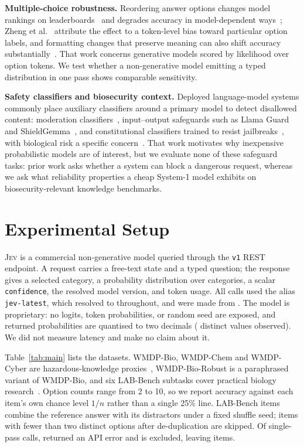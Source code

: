 \documentclass[conference,compsoc]{IEEEtran}
\newcommand{\jev}{\textsc{Jev}}
\begin{document}
\textbf{Multiple-choice robustness.} Reordering answer options changes model rankings on leaderboards~\cite{alzahrani} and
degrades accuracy in model-dependent ways~\cite{gupta}; Zheng et al.~\cite{zheng}
attribute the effect to a token-level bias toward particular option labels, and
formatting changes that preserve meaning can also shift accuracy
substantially~\cite{formatspread}. That work concerns generative models scored by likelihood
over option tokens. We test whether a non-generative model emitting a typed distribution in
one pass shows comparable sensitivity.

\textbf{Safety classifiers and biosecurity context.} Deployed language-model systems
commonly place auxiliary classifiers around a primary model to detect disallowed content:
moderation classifiers~\cite{openaimod}, input--output safeguards such as Llama
Guard~\cite{llamaguard} and ShieldGemma~\cite{shieldgemma}, and constitutional classifiers
trained to resist jailbreaks~\cite{constclass}, with biological risk a specific
concern~\cite{biorisk}. That work motivates why inexpensive probabilistic models are of
interest, but we evaluate none of these safeguard tasks: prior work asks whether a system
can block a dangerous request, whereas we ask what reliability properties a cheap System-1
model exhibits on biosecurity-relevant knowledge benchmarks.

\section{Experimental Setup}
\label{sec:setup}

\jev{} is a commercial non-generative model queried through the \texttt{v1} REST endpoint.
A request carries a free-text state and a typed question; the response gives a selected
category, a probability distribution over categories, a scalar \texttt{confidence}, the
resolved model version, and token usage. All calls used the alias \texttt{jev-latest},
which resolved to \texttt{\statModelVersion{}} throughout, and were made from
\statCollectionDates{}. The model is proprietary: no logits, token probabilities, or random
seed are exposed, and returned probabilities are quantised to two decimals
(\statDistinctProbs{} distinct values observed). We did not measure latency and make no
claim about it.

Table~\ref{tab:main} lists the \statNDatasets{} datasets. WMDP-Bio, WMDP-Chem and
WMDP-Cyber are hazardous-knowledge proxies~\cite{wmdp}, WMDP-Bio-Robust is a paraphrased
variant of WMDP-Bio, and six LAB-Bench subtasks cover practical biology
research~\cite{labbench}. Option counts range from 2 to 10, so we report accuracy against
each item's own chance level $1/n$ rather than a single 25\% line. LAB-Bench items combine
the reference answer with its distractors under a fixed shuffle seed; items with fewer than
two distinct options after de-duplication are skipped. Of \statNItemsRaw{} single-pass
calls, \statNErrors{} returned an API error and is excluded, leaving \statNItems{} items.
\end{document}
